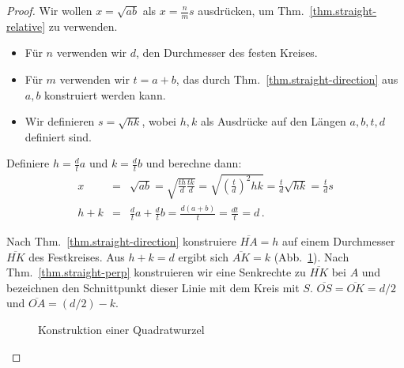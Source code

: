 \begin{proof}
Wir wollen $x=\sqrt{ab}$ als $x=\displaystyle\frac{n}{m}s$ ausdrücken, um Thm.~\ref{thm.straight-relative} zu verwenden.
\begin{itemize}
\item Für $n$ verwenden wir $d$, den Durchmesser des festen Kreises.
\item Für $m$ verwenden wir $t=a+b$, das durch Thm.~\ref{thm.straight-direction} aus $a,b$ konstruiert werden kann.
\item Wir definieren $s=\sqrt{hk}$, wobei $h,k$ als Ausdrücke auf den Längen $a,b,t,d$ definiert sind.
\end{itemize}
Definiere $h=\displaystyle\frac{d}{t}a$ und $k=\displaystyle\frac{d}{t}b$ und berechne dann:
\begin{eqnarray*}
x&=&\sqrt{ab}=\sqrt{\frac{th}{d}\frac{tk}{d}}=\sqrt{\left(\frac{t}{d}\right)^2hk}=\frac{t}{d}\sqrt{hk}=\frac{t}{d}s\\
h+k &=& \frac{d}{t}a + \frac{d}{t}b = \frac{d(a+b)}{t} = \frac{dt}{t} = d\,.
\end{eqnarray*}

Nach Thm.~\ref{thm.straight-direction} konstruiere $\overline{HA}= h$ auf einem Durchmesser $\overline{HK}$ des Festkreises. Aus $h+k=d$ ergibt sich $\overline{AK}=k$ (Abb.~\ref{f.se-sqrt}). Nach Thm.~\ref{thm.straight-perp} konstruieren wir eine Senkrechte zu $\overline{HK}$ bei $A$ und bezeichnen den Schnittpunkt dieser Linie mit dem Kreis mit $S$. $\overline{OS}=\overline{OK}=d/2$ und $\overline{OA}=(d/2)-k$. 
\begin{figure}[t]
\begin{center}
\end{center}
\caption{Konstruktion einer Quadratwurzel}\label{f.se-sqrt}
\end{figure}


\end{proof}
